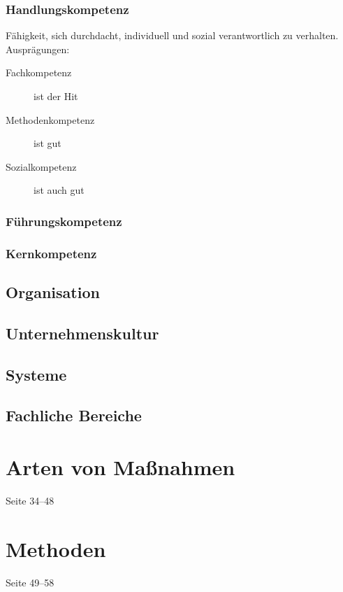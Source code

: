 \documentclass[a4paper, 12pt]{article}
\begin{document}
\subsubsection*{Handlungskompetenz}
Fähigkeit, sich durchdacht, individuell und sozial verantwortlich zu verhalten. Ausprägungen:
\begin{description}
  \item[Fachkompetenz] ist der Hit
  \item[Methodenkompetenz] ist gut
  \item[Sozialkompetenz] ist auch gut
\end{description}

\subsubsection*{Führungskompetenz}

\subsubsection*{Kernkompetenz}


\subsection{Organisation}


\subsection{Unternehmenskultur}


\subsection{Systeme}


\subsection{Fachliche Bereiche}



\section{Arten von Maßnahmen}
Seite 34--48



\section{Methoden}
Seite 49--58
\end{document}

